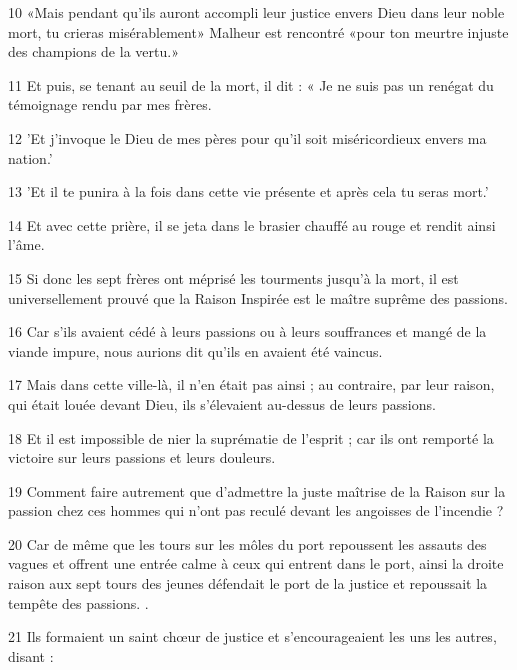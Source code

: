 \par 10 «Mais pendant qu'ils auront accompli leur justice envers Dieu dans leur noble mort, tu crieras misérablement» Malheur est rencontré «pour ton meurtre injuste des champions de la vertu.»

\par 11 Et puis, se tenant au seuil de la mort, il dit : « Je ne suis pas un renégat du témoignage rendu par mes frères.

\par 12 'Et j'invoque le Dieu de mes pères pour qu'il soit miséricordieux envers ma nation.'

\par 13 'Et il te punira à la fois dans cette vie présente et après cela tu seras mort.'

\par 14 Et avec cette prière, il se jeta dans le brasier chauffé au rouge et rendit ainsi l'âme.

\par 15 Si donc les sept frères ont méprisé les tourments jusqu'à la mort, il est universellement prouvé que la Raison Inspirée est le maître suprême des passions.

\par 16 Car s'ils avaient cédé à leurs passions ou à leurs souffrances et mangé de la viande impure, nous aurions dit qu'ils en avaient été vaincus.

\par 17 Mais dans cette ville-là, il n'en était pas ainsi ; au contraire, par leur raison, qui était louée devant Dieu, ils s'élevaient au-dessus de leurs passions.

\par 18 Et il est impossible de nier la suprématie de l'esprit ; car ils ont remporté la victoire sur leurs passions et leurs douleurs.

\par 19 Comment faire autrement que d'admettre la juste maîtrise de la Raison sur la passion chez ces hommes qui n'ont pas reculé devant les angoisses de l'incendie ?

\par 20 Car de même que les tours sur les môles du port repoussent les assauts des vagues et offrent une entrée calme à ceux qui entrent dans le port, ainsi la droite raison aux sept tours des jeunes défendait le port de la justice et repoussait la tempête des passions. .

\par 21 Ils formaient un saint chœur de justice et s'encourageaient les uns les autres, disant :

